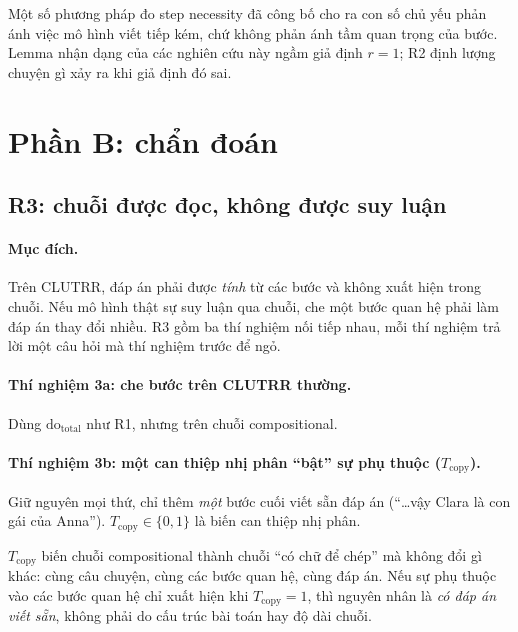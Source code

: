 \documentclass[11pt]{article}
\newcommand{\dt}{\mathrm{do}_{\text{total}}}
\begin{document}
\begin{ketluan}
Một số phương pháp đo step necessity đã công bố cho ra con số chủ yếu phản ánh việc mô hình viết
tiếp kém, chứ không phản ánh tầm quan trọng của bước. Lemma nhận dạng của các nghiên cứu này ngầm
giả định $r=1$; R2 định lượng chuyện gì xảy ra khi giả định đó sai.
\end{ketluan}

\section{Phần B: chẩn đoán}

\subsection{R3: chuỗi được đọc, không được suy luận}
\label{sec:r3}

\paragraph{Mục đích.} Trên CLUTRR, đáp án phải được \emph{tính} từ các bước và không xuất hiện
trong chuỗi. Nếu mô hình thật sự suy luận qua chuỗi, che một bước quan hệ phải làm đáp án thay đổi
nhiều. R3 gồm ba thí nghiệm nối tiếp nhau, mỗi thí nghiệm trả lời một câu hỏi mà thí nghiệm trước
để ngỏ.

\paragraph{Thí nghiệm 3a: che bước trên CLUTRR thường.} Dùng $\dt$ như R1, nhưng trên chuỗi
compositional.

\paragraph{Thí nghiệm 3b: một can thiệp nhị phân ``bật'' sự phụ thuộc ($T_{\text{copy}}$).} Giữ
nguyên mọi thứ, chỉ thêm \emph{một} bước cuối viết sẵn đáp án (``\dots vậy Clara là con gái của
Anna''). $T_{\text{copy}}\in\{0,1\}$ là biến can thiệp nhị phân.

\begin{thietke}
$T_{\text{copy}}$ biến chuỗi compositional thành chuỗi ``có chữ để chép'' mà không đổi gì khác:
cùng câu chuyện, cùng các bước quan hệ, cùng đáp án. Nếu sự phụ thuộc vào các bước quan hệ chỉ
xuất hiện khi $T_{\text{copy}}=1$, thì nguyên nhân là \emph{có đáp án viết sẵn}, không phải do
cấu trúc bài toán hay độ dài chuỗi.
\end{thietke}
\end{document}
